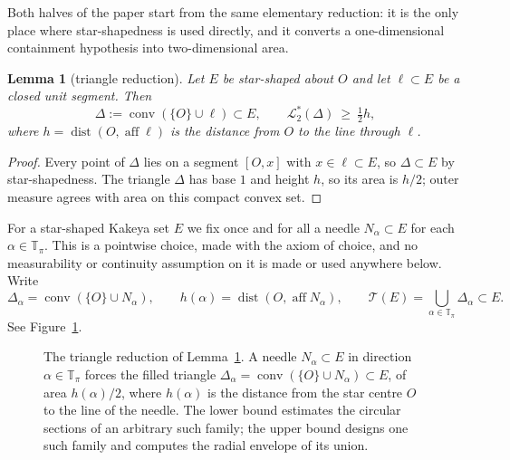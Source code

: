\documentclass[11pt]{article}
\theoremstyle{plain}
\newtheorem{lemma}[theorem]{Lemma}
\theoremstyle{definition}
\theoremstyle{remark}
\newcommand{\Tp}{\mathbb{T}_{\pi}}
\newcommand{\Lout}{\mathcal{L}^{*}_{2}}
\newcommand{\conv}{\operatorname{conv}}
\newcommand{\Tri}{\mathcal{T}}
\begin{document}
Both halves of the paper start from the same elementary reduction: it is the
only place where star-shapedness is used directly, and it converts a
one-dimensional containment hypothesis into two-dimensional area.

\begin{lemma}[triangle reduction]\label{lem:triangle}
Let $E$ be star-shaped about $O$ and let $\ell\subset E$ be a closed unit
segment. Then
\[
  \Delta:=\conv(\{O\}\cup\ell)\subset E,
  \qquad
  \Lout(\Delta)\ \ge\ \tfrac12 h,
\]
where $h=\operatorname{dist}(O,\operatorname{aff}\ell)$ is the distance from $O$
to the line through $\ell$.
\end{lemma}

\begin{proof}
Every point of $\Delta$ lies on a segment $[O,x]$ with $x\in\ell\subset E$, so
$\Delta\subset E$ by star-shapedness. The triangle $\Delta$ has base $1$ and
height $h$, so its area is $h/2$; outer measure agrees with area on this compact
convex set.
\end{proof}

For a star-shaped Kakeya set $E$ we fix once and for all a needle
$N_{\alpha}\subset E$ for each $\alpha\in\Tp$. This is a pointwise choice, made
with the axiom of choice, and no measurability or continuity assumption on it is
made or used anywhere below. Write
\[
  \Delta_{\alpha}=\conv(\{O\}\cup N_{\alpha}),\qquad
  h(\alpha)=\operatorname{dist}(O,\operatorname{aff}N_{\alpha}),
  \qquad
  \Tri(E)=\bigcup_{\alpha\in\Tp}\Delta_{\alpha}\subset E .
\]
See Figure~\ref{fig:triangle}.

\begin{figure}[t]
\centering
{}
\caption{The triangle reduction of Lemma~\ref{lem:triangle}. A needle
$N_{\alpha}\subset E$ in direction $\alpha\in\Tp$ forces the filled triangle
$\Delta_{\alpha}=\conv(\{O\}\cup N_{\alpha})\subset E$, of area $h(\alpha)/2$,
where $h(\alpha)$ is the distance from the star centre $O$ to the line of the
needle. The lower bound estimates the circular sections of an arbitrary such
family; the upper bound designs one such family and computes the radial envelope
of its union.}
\label{fig:triangle}
\end{figure}
\end{document}

